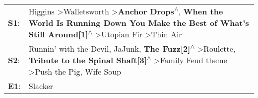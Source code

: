 \begin{supertabular}{p{0.03\textwidth}p{0.92\textwidth}}
 \textbf{S1}:  &                                       Higgins\textsuperscript{} \textgreater \enspace Walletsworth\textsuperscript{} \textgreater \enspace \textbf{Anchor Drops\textsuperscript{$\wedge$}}, \enspace \textbf{When the World Is Running Down You Make the Best of What's Still Around[1]\textsuperscript{$\wedge$}} \textgreater \enspace Utopian Fir\textsuperscript{} \textgreater \enspace Thin Air\textsuperscript{}  \enspace  \\
 \textbf{S2}:  &  Runnin' with the Devil\textsuperscript{}, \enspace JaJunk\textsuperscript{}, \enspace \textbf{The Fuzz[2]\textsuperscript{$\wedge$}} \textgreater \enspace Roulette\textsuperscript{}, \enspace \textbf{Tribute to the Spinal Shaft[3]\textsuperscript{$\wedge$}} \textgreater \enspace Family Feud theme\textsuperscript{} \textgreater \enspace Push the Pig\textsuperscript{}, \enspace Wife Soup\textsuperscript{}  \enspace  \\
 \textbf{E1}:  &                                                                                                                                                                                                                                                                                                                                                                                               Slacker\textsuperscript{}  \enspace  \\
\end{supertabular}
